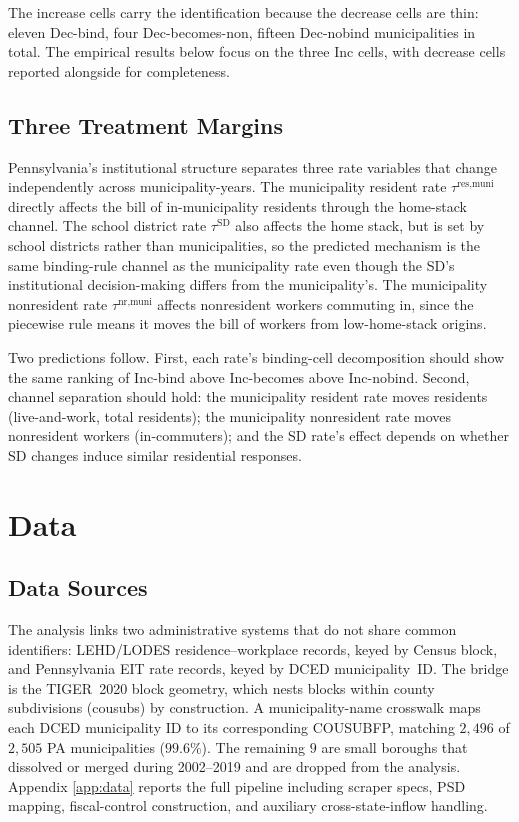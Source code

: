 \documentclass[12pt]{article}
\begin{document}
The increase cells carry the identification because the decrease
cells are thin: eleven Dec-bind, four Dec-becomes-non, fifteen
Dec-nobind municipalities in total. The empirical results below
focus on the three Inc cells, with decrease cells reported alongside
for completeness.

\subsection{Three Treatment Margins}
\label{subsec:treatments}

Pennsylvania's institutional structure separates three rate
variables that change independently across municipality-years. The municipality
resident rate $\tau^{\text{res,muni}}$ directly affects the bill of
in-municipality residents through the home-stack channel. The school
district rate $\tau^{\text{SD}}$ also affects the home stack, but is
set by school districts rather than municipalities, so the predicted
mechanism is the same binding-rule channel as the municipality rate even
though the SD's institutional decision-making differs from the
municipality's. The municipality nonresident rate $\tau^{\text{nr,muni}}$ affects
nonresident workers commuting in, since the piecewise rule means it
moves the bill of workers from low-home-stack origins.

Two predictions follow. First, each rate's binding-cell decomposition
should show the same ranking of Inc-bind above Inc-becomes above
Inc-nobind. Second, channel separation should hold: the municipality
resident rate moves residents (live-and-work, total residents); the
municipality nonresident rate moves nonresident workers (in-commuters); and
the SD rate's effect depends on whether SD changes induce similar
residential responses.

\section{Data}
\label{sec:data}

\subsection{Data Sources}
\label{subsec:sources}
\label{subsec:sample}
\label{subsec:pipeline}

The analysis links two administrative systems that do not share
common identifiers: LEHD/LODES residence--workplace records, keyed by
Census block, and Pennsylvania EIT rate records, keyed by DCED
municipality~ID. The bridge is the TIGER~2020 block geometry, which
nests blocks within county subdivisions (cousubs) by construction. A
municipality-name crosswalk maps each DCED municipality ID to its
corresponding COUSUBFP, matching $2{,}496$ of $2{,}505$ PA municipalities
($99.6\%$). The remaining $9$ are small boroughs that dissolved or
merged during 2002--2019 and are dropped from the analysis. Appendix
\ref{app:data} reports the full pipeline including scraper specs,
PSD mapping, fiscal-control construction, and auxiliary
cross-state-inflow handling.
\end{document}
